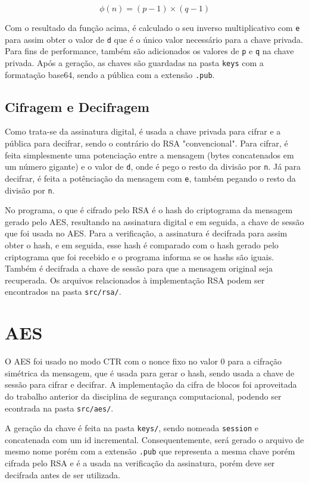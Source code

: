\documentclass[12pt]{article}
\begin{document}
\[
    \phi(n) = (p-1) \times (q-1)
\]

Com o resultado da função acima, é calculado o seu inverso multiplicativo com \texttt{e} para assim obter o valor de \texttt{d} que é o único valor necessário para a chave privada. Para fins de performance, também são adicionados os valores de \texttt{p} e \texttt{q} na chave privada. Após a geração, as chaves são guardadas na pasta \texttt{keys} com a formatação base64, sendo a pública com a extensão \texttt{.pub}.

\subsection{Cifragem e Decifragem}

Como trata-se da assinatura digital, é usada a chave privada para cifrar e a pública para decifrar, sendo o contrário do RSA "convencional". Para cifrar, é feita simplesmente uma potenciação entre a mensagem (bytes concatenados em um número gigante) e o valor de \texttt{d}, onde é pego o resto da divisão por \texttt{n}. Já para decifrar, é feita a potênciação da mensagem com \texttt{e}, também pegando o resto da divisão por \texttt{n}.

No programa, o que é cifrado pelo RSA é o hash do criptograma da mensagem gerado pelo AES, resultando na assinatura digital e em seguida, a chave de sessão que foi usada no AES. Para a verificação, a assinatura é decifrada para assim obter o hash, e em seguida, esse hash é comparado com o hash gerado pelo criptograma que foi recebido e o programa informa se os hashs são iguais. Também é decifrada a chave de sessão para que a mensagem original seja recuperada. Os arquivos relacionados à implementação RSA podem ser encontrados na pasta \texttt{src/rsa/}.

\section{AES}

O AES foi usado no modo CTR com o nonce fixo no valor 0 para a cifração simétrica da mensagem, que é usada para gerar o hash, sendo usada a chave de sessão para cifrar e decifrar. A implementação da cifra de blocos foi aproveitada do trabalho anterior da disciplina de segurança computacional, podendo ser econtrada na pasta \texttt{src/aes/}.

A geração da chave é feita na pasta \texttt{keys/}, sendo nomeada \texttt{session} e concatenada com um id incremental. Consequentemente, será gerado o arquivo de mesmo nome porém com a extensão \texttt{.pub} que representa a mesma chave porém cifrada pelo RSA e é a usada na verificação da assinatura, porém deve ser decifrada antes de ser utilizada. 
\end{document}
